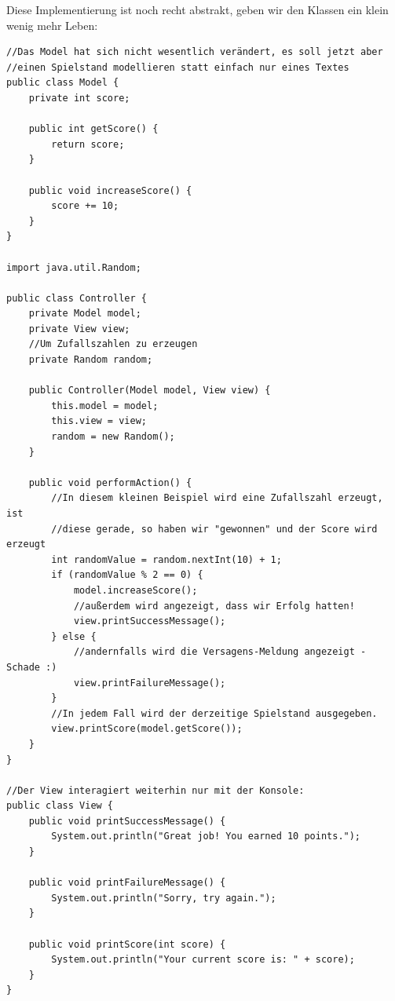 \documentclass{article}
\begin{document}
Diese Implementierung ist noch recht abstrakt, geben wir den Klassen ein klein wenig mehr Leben:
\begin{verbatim}
//Das Model hat sich nicht wesentlich verändert, es soll jetzt aber 
//einen Spielstand modellieren statt einfach nur eines Textes
public class Model {
    private int score;

    public int getScore() {
        return score;
    }

    public void increaseScore() {
        score += 10;
    }
}

import java.util.Random;

public class Controller {
    private Model model;
    private View view;
    //Um Zufallszahlen zu erzeugen
    private Random random;

    public Controller(Model model, View view) {
        this.model = model;
        this.view = view;
        random = new Random();
    }

    public void performAction() {
        //In diesem kleinen Beispiel wird eine Zufallszahl erzeugt, ist
        //diese gerade, so haben wir "gewonnen" und der Score wird erzeugt
        int randomValue = random.nextInt(10) + 1;
        if (randomValue % 2 == 0) {
            model.increaseScore();
            //außerdem wird angezeigt, dass wir Erfolg hatten!
            view.printSuccessMessage();
        } else {
            //andernfalls wird die Versagens-Meldung angezeigt - Schade :)
            view.printFailureMessage();
        }
        //In jedem Fall wird der derzeitige Spielstand ausgegeben.
        view.printScore(model.getScore());
    }
}

//Der View interagiert weiterhin nur mit der Konsole: 
public class View {
    public void printSuccessMessage() {
        System.out.println("Great job! You earned 10 points.");
    }

    public void printFailureMessage() {
        System.out.println("Sorry, try again.");
    }

    public void printScore(int score) {
        System.out.println("Your current score is: " + score);
    }
}


\end{verbatim}
\end{document}
